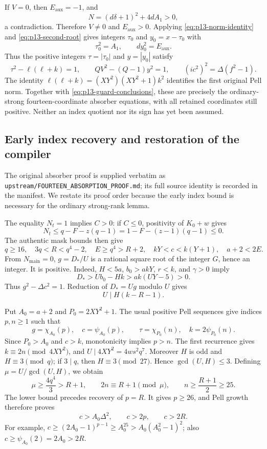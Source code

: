 If $V=0$, then $E_{\mathrm{aux}}=-1$, and
\[
 N=(d\delta+1)^2+4dA_1>0,
\]
a contradiction. Therefore $V\ne0$ and $E_{\mathrm{aux}}>0$.
Applying \eqref{eq:p13-norm-identity} and
\eqref{eq:p13-second-root} gives integers
$\tau_0$ and $y_0=x-\tau_0$ with
\[
 \tau_0^2=A_1,\qquad dy_0^2=E_{\mathrm{aux}}.
\]
Thus the positive integers $\tau=|\tau_0|$ and $y=|y_0|$ satisfy
\begin{equation}
 \tau^2-\ell(\ell+k)=1,\qquad
 QV^2-(Q-1)y^2=1,\qquad
 (ic^2)^2=\Delta(f^2-1).
 \label{eq:p13-restored-roots}
\end{equation}
The identity
$\ell(\ell+k)=(XY^2)(XY^2+1)k^2$ identifies the first original Pell norm.
Together with \eqref{eq:p13-guard-conclusions}, these are precisely the
ordinary-strong fourteen-coordinate absorber equations, with all retained
coordinates still positive. Neither an index quotient nor its sign has
yet been assumed.

\subsection{Early index recovery and restoration of the compiler}

The original absorber proof is supplied verbatim as
\texttt{upstream/FOURTEEN\_ABSORPTION\_PROOF.md}; its full source identity
is recorded in the manifest. We restate its proof order because the early
index bound is necessary for the ordinary strong-rank lemma.

The equality $N_t=1$ implies $C>0$: if $C\le0$, positivity of $K_0+w$ gives
\[
 N_t\le q-F-z(q-1)=1-F-(z-1)(q-1)\le0.
\]
The authentic mask bounds then give
\begin{equation}
 q\ge16,\quad 3q<R<q^4-2,\quad E\ge q^4>R+2,\quad
 kY<c<k(Y+1),\quad a+2<2E.
 \label{eq:p13-outer-bounds}
\end{equation}
From $N_{\mathrm{main}}=0$, $g=D_*/U$ is a rational square root of the
integer $G$, hence an integer. It is positive. Indeed, $H<5a$, $b_0>akY$,
$r<k$, and $\gamma>0$ imply
\[
 D_*>Ub_0-Hk>ak(UY-5)>0.
\]
Thus $g^2-\Delta c^2=1$. Reduction of $D_*=Ug$ modulo $U$ gives
\begin{equation}
 U\mid H(k-R-1).
 \label{eq:p13-absorbed-congruence}
\end{equation}

Put $A_0=a+2$ and $P_0=2XY^2+1$. The usual positive Pell sequences give
indices $p,n\ge1$ such that
\[
 g=\chi_{A_0}(p),\quad c=\psi_{A_0}(p),\qquad
 \tau=\chi_{P_0}(n),\quad k=2\psi_{P_0}(n).
\]
Since $P_0>A_0$ and $c>k$, monotonicity implies $p>n$.
The first recurrence gives $k\equiv2n\pmod{4XY^2}$, and
$U\mid4XY^2=4ws^2q^7$. Moreover $H$ is odd and $H\equiv3\pmod q$;
if $3\mid q$, then $H\equiv3\pmod{27}$. Hence
$\gcd(U,H)\le3$. Defining $\mu=U/\gcd(U,H)$, we obtain
\[
 \mu\ge\frac{4q^4}{3}>R+1,\qquad
 2n\equiv R+1\pmod\mu,
 \qquad n\ge\frac{R+1}{2}\ge25.
\]
The lower bound precedes recovery of $p=R$. It gives $p\ge26$, and Pell
growth therefore proves
\begin{equation}
 c>A_0\Delta^2,\qquad c>2p,\qquad c>2R.
 \label{eq:p13-rank-hypotheses}
\end{equation}
For example,
$c\ge(2A_0-1)^{p-1}\ge A_0^{25}>A_0(A_0^2-1)^2$;
also $c\ge\psi_{A_0}(2)=2A_0>2R$.


